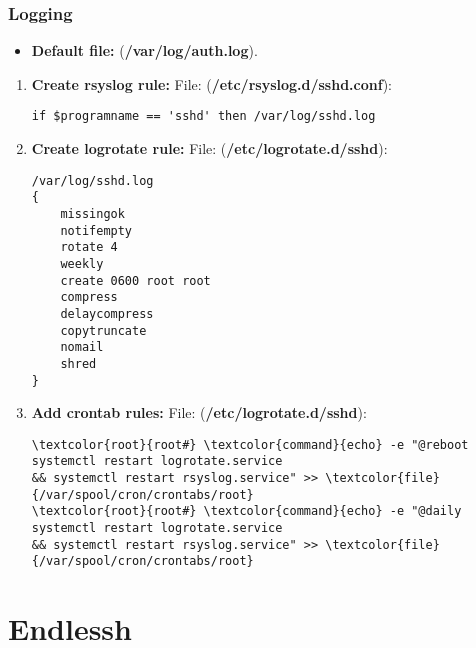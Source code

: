 \documentclass[10pt, a4paper, onecolumn, openany]{book} %
\begin{document}
\subsection{Logging}
\begin{itemize}
    \item \textbf{Default file:} (\textbf{\textcolor{file}{/var/log/auth.log}}).
\end{itemize}
\begin{enumerate}
    \item \textbf{Create rsyslog rule:}
\newline File: (\textbf{\textcolor{file}{/etc/rsyslog.d/sshd.conf}}):
\begin{verbatim}
if $programname == 'sshd' then /var/log/sshd.log
\end{verbatim}
    \item \textbf{Create logrotate rule:}
\newline File: (\textbf{\textcolor{file}{/etc/logrotate.d/sshd}}):
\begin{verbatim}
/var/log/sshd.log
{
    missingok
    notifempty
    rotate 4
    weekly
    create 0600 root root
    compress
    delaycompress
    copytruncate
    nomail
    shred
}
\end{verbatim}
    \item \textbf{Add crontab rules:}
\newline File: (\textbf{\textcolor{file}{/etc/logrotate.d/sshd}}):
\begin{Verbatim}[commandchars=\\\{\}]
\textcolor{root}{root#} \textcolor{command}{echo} -e "@reboot systemctl restart logrotate.service 
&& systemctl restart rsyslog.service" >> \textcolor{file}{/var/spool/cron/crontabs/root}
\textcolor{root}{root#} \textcolor{command}{echo} -e "@daily systemctl restart logrotate.service 
&& systemctl restart rsyslog.service" >> \textcolor{file}{/var/spool/cron/crontabs/root}
\end{Verbatim}
\end{enumerate}
\chapter{Endlessh}
\end{document}

